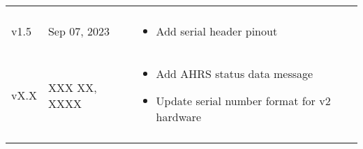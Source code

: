 \begin{longtable}{| >{\centering}p{} | p{} | >{\raggedright\arraybackslash}p{} |}
\begin{itemize}
        \end{itemize}\\
        v1.5 & Sep 07, 2023 &
        \begin{itemize}
            \item Add serial header pinout
        \end{itemize}\\
        vX.X & XXX XX, XXXX &
        \begin{itemize}
            \item Add \acs{AHRS} status data message
            \item Update serial number format for v2 hardware
        \end{itemize}\\
        \arrayrulecolor{gray!50}\hline
    \end{longtable}
\endgroup
